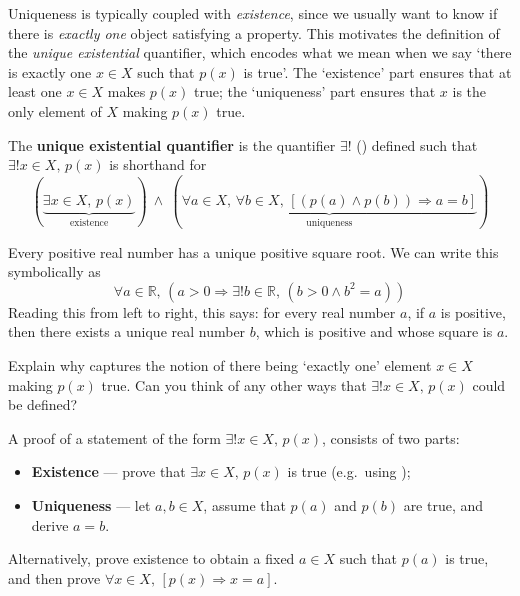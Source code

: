 Uniqueness is typically coupled with \textit{existence}, since we usually want to know if there is \textit{exactly one} object satisfying a property. This motivates the definition of the \textit{unique existential} quantifier, which encodes what we mean when we say `there is exactly one $x \in X$ such that $p(x)$ is true'. The `existence' part ensures that at least one $x \in X$ makes $p(x)$ true; the `uniqueness' part ensures that $x$ is the only element of $X$ making $p(x)$ true.

\begin{definition}
\label{defUniqueExistentialQuantifier}
The \textbf{unique existential quantifier} is the quantifier $\exists !$ (\lindexmmc{\exists!}{$\exists!$}) defined such that $\exists ! x \in X,\, p(x)$ is shorthand for
\[(\underbrace{\exists x \in X,\, p(x)}_{\text{existence}}) ~ \wedge ~ (\underbrace{\forall a \in X,\, \forall b \in X,\, [(p(a) \wedge p(b)) \Rightarrow a=b]}_{\text{uniqueness}})\]
\end{definition}

\begin{example}
\label{exEveryPositiveRealHasUniqueSquareRoot}
Every positive real number has a unique positive square root. We can write this symbolically as
\[\forall a \in \mathbb{R},\, (a > 0 \Rightarrow \exists ! b \in \mathbb{R},\, (b > 0 \wedge b^2=a))\]
Reading this from left to right, this says: for every real number $a$, if $a$ is positive, then there exists a unique real number $b$, which is positive and whose square is $a$. 
\end{example}

\begin{discussion}
Explain why  captures the notion of there being `exactly one' element $x \in X$ making $p(x)$ true. Can you think of any other ways that $\exists ! x \in X,\, p(x)$ could be defined?
\end{discussion}

\begin{strategy}
A proof of a statement of the form $\exists ! x \in X,\, p(x)$, consists of two parts:
\begin{itemize}
\item \textbf{Existence} --- prove that $\exists x \in X,\, p(x)$ is true (e.g.\ using );
\item \textbf{Uniqueness} --- let $a,b \in X$, assume that $p(a)$ and $p(b)$ are true, and derive $a=b$.
\end{itemize}

Alternatively, prove existence to obtain a fixed $a \in X$ such that $p(a)$ is true, and then prove $\forall x \in X,\, [p(x) \Rightarrow x=a]$.
\end{strategy}


